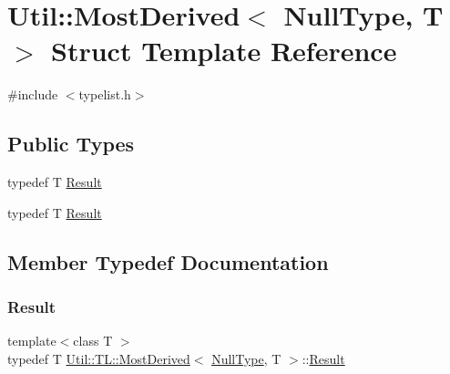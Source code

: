 \hypertarget{structUtil_1_1TL_1_1MostDerived_3_01NullType_00_01T_01_4}{}\section{Util\+:\+:Most\+Derived$<$ Null\+Type, T $>$ Struct Template Reference}
\label{structUtil_1_1TL_1_1MostDerived_3_01NullType_00_01T_01_4}


{\ttfamily \#include $<$typelist.\+h$>$}

\subsection*{Public Types}
\begin{DoxyCompactItemize}
\item 
typedef T \mbox{\hyperlink{structUtil_1_1TL_1_1MostDerived_3_01NullType_00_01T_01_4_a67aeb01e6a29f0a07798b8626b0d69c2}{Result}}
\item 
typedef T \mbox{\hyperlink{structUtil_1_1TL_1_1MostDerived_3_01NullType_00_01T_01_4_a67aeb01e6a29f0a07798b8626b0d69c2}{Result}}
\end{DoxyCompactItemize}


\subsection{Member Typedef Documentation}
\mbox{\label{structUtil_1_1TL_1_1MostDerived_3_01NullType_00_01T_01_4_a67aeb01e6a29f0a07798b8626b0d69c2}} 
\subsubsection{\texorpdfstring{Result}{Result}\hspace{0.1cm}{\footnotesize\ttfamily [1/2]}}
{\footnotesize\ttfamily template$<$class T $>$ \\
typedef T \mbox{\hyperlink{structUtil_1_1TL_1_1MostDerived}{Util\+::\+T\+L\+::\+Most\+Derived}}$<$ \mbox{\hyperlink{classUtil_1_1NullType}{Null\+Type}}, T $>$\+::\mbox{\hyperlink{structUtil_1_1TL_1_1MostDerived_3_01NullType_00_01T_01_4_a67aeb01e6a29f0a07798b8626b0d69c2}{Result}}}

